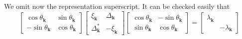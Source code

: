 We omit now the representation superscript. It can be checked easily that
\[
	\begin{bmatrix}
		\cos \theta_\mathbf{k} & \sin \theta_\mathbf{k} \\
		- \sin \theta_\mathbf{k} & \cos \theta_\mathbf{k}
	\end{bmatrix} 
	\begin{bmatrix}
		\xi_\mathbf{k} & \Delta_\mathbf{k} \\
		\Delta_\mathbf{k}^* & - \xi_\mathbf{k}
	\end{bmatrix}
	\begin{bmatrix}
		\cos \theta_\mathbf{k} & -\sin \theta_\mathbf{k} \\
		\sin \theta_\mathbf{k} & \cos \theta_\mathbf{k}
	\end{bmatrix} =
	\begin{bmatrix}
		\lambda_\mathbf{k} & \\
		& -\lambda_\mathbf{k}
	\end{bmatrix}
\]


